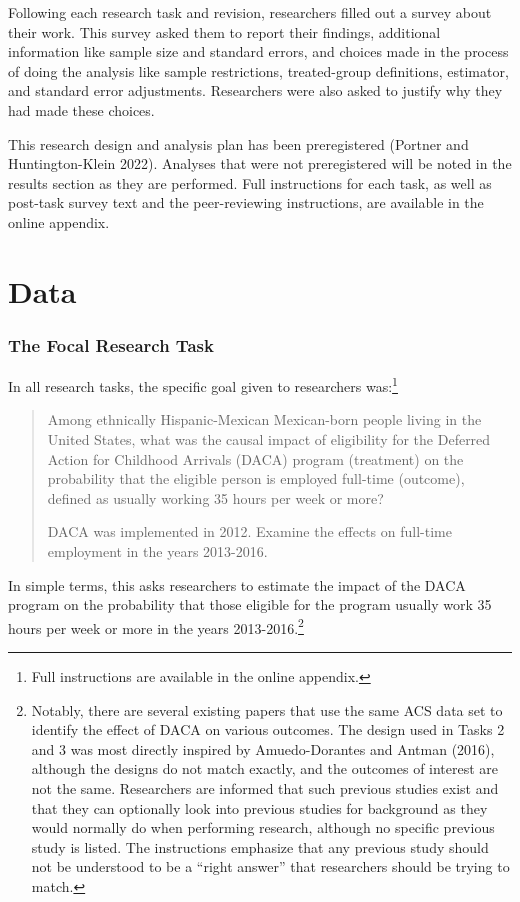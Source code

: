 \documentclass[
  letterpaper,
  DIV=11,
  numbers=noendperiod]{scrartcl}
\begin{document}
Following each research task and revision, researchers filled out a
survey about their work. This survey asked them to report their
findings, additional information like sample size and standard errors,
and choices made in the process of doing the analysis like sample
restrictions, treated-group definitions, estimator, and standard error
adjustments. Researchers were also asked to justify why they had made
these choices.


This research design and analysis plan has been preregistered (Portner
and Huntington-Klein 2022). Analyses that were not preregistered will be
noted in the results section as they are performed. Full instructions
for each task, as well as post-task survey text and the peer-reviewing
instructions, are available in the online appendix.

\hypertarget{data}{%
\section{Data}\label{data}}

\hypertarget{the-focal-research-task}{%
\subsubsection{The Focal Research Task}\label{the-focal-research-task}}

\label{sec:focaltask}

In all research tasks, the specific goal given to researchers
was:\footnote{Full instructions are available in the online appendix.}

\begin{quote}
Among ethnically Hispanic-Mexican Mexican-born people living in the
United States, what was the causal impact of eligibility for the
Deferred Action for Childhood Arrivals (DACA) program (treatment) on the
probability that the eligible person is employed full-time (outcome),
defined as usually working 35 hours per week or more?

DACA was implemented in 2012. Examine the effects on full-time
employment in the years 2013-2016.
\end{quote}

In simple terms, this asks researchers to estimate the impact of the
DACA program on the probability that those eligible for the program
usually work 35 hours per week or more in the years
2013-2016.\footnote{Notably, there are several existing papers that use
  the same ACS data set to identify the effect of DACA on various
  outcomes. The design used in Tasks 2 and 3 was most directly inspired
  by Amuedo-Dorantes and Antman (2016), although the designs do not
  match exactly, and the outcomes of interest are not the same.
  Researchers are informed that such previous studies exist and that
  they can optionally look into previous studies for background as they
  would normally do when performing research, although no specific
  previous study is listed. The instructions emphasize that any previous
  study should not be understood to be a ``right answer'' that
  researchers should be trying to match.}
\end{document}
